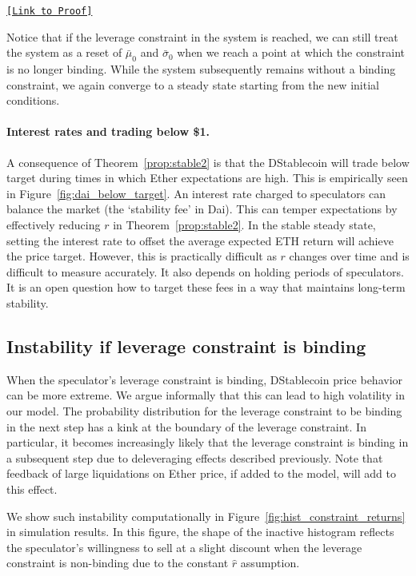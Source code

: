\begin{center} \hyperlink{pf:stable2}{\texttt{[Link to Proof]}} \end{center}



Notice that if the leverage constraint in the system is reached, we can still treat the system as a reset of $\bar\mu_0$ and $\bar\sigma_0$ when we reach a point at which the constraint is no longer binding. While the system subsequently remains without a binding constraint, we again converge to a steady state starting from the new initial conditions.


\paragraph{Interest rates and trading below \$1.}
A consequence of Theorem~\ref{prop:stable2} is that the DStablecoin will trade below target during times in which Ether expectations are high. This is empirically seen in Figure~\ref{fig:dai_below_target}. An interest rate charged to speculators can balance the market (the `stability fee' in Dai). This can temper expectations by effectively reducing $r$ in Theorem~\ref{prop:stable2}. In the stable steady state, setting the interest rate to offset the average expected ETH return will achieve the price target. However, this is practically difficult as $r$ changes over time and is difficult to measure accurately. It also depends on holding periods of speculators. It is an open question how to target these fees in a way that maintains long-term stability.




\subsection{Instability if leverage constraint is binding}\label{sec:instability}
When the speculator's leverage constraint is binding, DStablecoin price behavior can be more extreme. We argue informally that this can lead to high volatility in our model. The probability distribution for the leverage constraint to be binding in the next step has a kink at the boundary of the leverage constraint. In particular, it becomes increasingly likely that the leverage constraint is binding in a subsequent step due to deleveraging effects described previously. Note that feedback of large liquidations on Ether price, if added to the model, will add to this effect.

We show such instability computationally in Figure~\ref{fig:hist_constraint_returns} in simulation results. In this figure, the shape of the inactive histogram reflects the speculator's willingness to sell at a slight discount when the leverage constraint is non-binding due to the constant $\hat r$ assumption.

